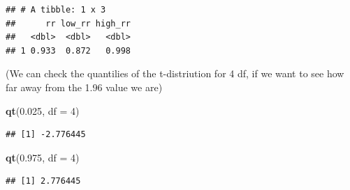 \documentclass[
]{book}
\newenvironment{Shaded}{\begin{snugshade}}{\end{snugshade}}
\newcommand{\DataTypeTok}[1]{\textcolor[rgb]{0.13,0.29,0.53}{#1}}
\newcommand{\DecValTok}[1]{\textcolor[rgb]{0.00,0.00,0.81}{#1}}
\newcommand{\FloatTok}[1]{\textcolor[rgb]{0.00,0.00,0.81}{#1}}
\newcommand{\KeywordTok}[1]{\textcolor[rgb]{0.13,0.29,0.53}{\textbf{#1}}}
\newcommand{\NormalTok}[1]{#1}
\newcommand{\OperatorTok}[1]{\textcolor[rgb]{0.81,0.36,0.00}{\textbf{#1}}}
\newcommand{\StringTok}[1]{\textcolor[rgb]{0.31,0.60,0.02}{#1}}
\begin{document}
\begin{Shaded}
\end{Shaded}

\begin{verbatim}
## # A tibble: 1 x 3
##      rr low_rr high_rr
##   <dbl>  <dbl>   <dbl>
## 1 0.933  0.872   0.998
\end{verbatim}

(We can check the quantilies of the t-distriution for 4 df, if we want to see how far away from the 1.96 value we are)

\begin{Shaded}
\begin{Highlighting}[]
\KeywordTok{qt}\NormalTok{(}\FloatTok{0.025}\NormalTok{, }\DataTypeTok{df =} \DecValTok{4}\NormalTok{)}
\end{Highlighting}
\end{Shaded}

\begin{verbatim}
## [1] -2.776445
\end{verbatim}

\begin{Shaded}
\begin{Highlighting}[]
\KeywordTok{qt}\NormalTok{(}\FloatTok{0.975}\NormalTok{, }\DataTypeTok{df =} \DecValTok{4}\NormalTok{) }
\end{Highlighting}
\end{Shaded}

\begin{verbatim}
## [1] 2.776445
\end{verbatim}
\end{document}
